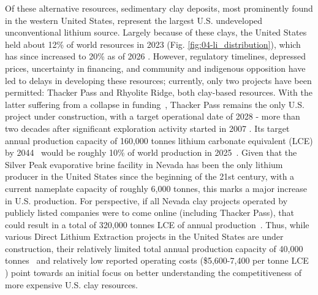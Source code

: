 \documentclass{article}
\renewcommand\_{\textunderscore\allowbreak}
\begin{document}
Of these alternative resources, sedimentary clay deposits, most prominently found in the western United States, represent the largest U.S. undeveloped unconventional lithium source. Largely because of these clays, the United States held about 12\% of world resources in 2023 (Fig. \ref{fig:04-li_distribution}), which has since increased to 20\% as of 2026 \cite{usgeologicalsurveyMineralCommoditySummaries2026}. However, regulatory timelines, depressed prices, uncertainty in financing, and community and indigenous opposition have led to delays in developing these resources; currently, only two projects have been permitted: Thacker Pass and Rhyolite Ridge, both clay-based resources. With the latter suffering from a collapse in funding~\cite{haasRhyoliteRidgeLithium2025}, Thacker Pass remains the only U.S. project under construction, with a target operational date of 2028 - more than two decades after significant exploration activity started in 2007 \cite{alonzoEvenLithiumPrices2025, NolanTestimony2025, calaway2025AnnualReport2025}. Its target annual production capacity of 160,000 tonnes lithium carbonate equivalent (LCE) by 2044~\cite{sgscanadaincSK1300Technical2024} would be roughly 10\% of world production in 2025~\cite{usgeologicalsurveyMineralCommoditySummaries2026}. Given that the Silver Peak evaporative brine facility in Nevada has been the only lithium producer in the United States since the beginning of the 21st century, with a current nameplate capacity of roughly 6,000 tonnes, this marks a major increase in U.S. production. For perspective, if all Nevada clay projects operated by publicly listed companies were to come online (including Thacker Pass), that could result in a total of 320,000 tonnes LCE of annual production~\cite{sgscanadaincSK1300Technical2024, fluorenterprisesRhyoliteRidgeLithiumBoron2022, dyerAmendedResourceEstimate, laneNI43101Technical2024, riordanTonopahLithiumClaims2023, samariMineralResourceEstimate2024}. Thus, while various Direct Lithium Extraction projects in the United States are under construction, their relatively limited total annual production capacity of 40,000 tonnes~\cite{worleyltdParadoxLithiumProject, gallardoSouthWestArkansas2025, brushNi43101Technical2023} and relatively low reported operating costs (\$5,600-7,400 per tonne LCE \cite{fitzgeraldCanEmergingIndustrial2025}) point towards an initial focus on better understanding the competitiveness of more expensive U.S. clay resources. 
\end{document}
